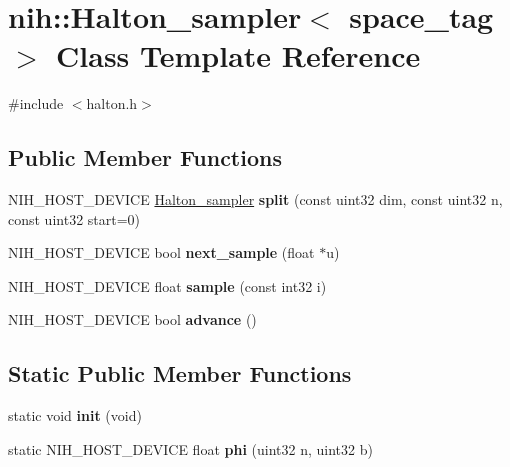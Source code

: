\hypertarget{classnih_1_1_halton__sampler}{
\section{nih\-:\-:\-Halton\-\_\-sampler$<$ space\-\_\-tag $>$ \-Class \-Template \-Reference}
\label{classnih_1_1_halton__sampler}
}


{\ttfamily \#include $<$halton.\-h$>$}

\subsection*{\-Public \-Member \-Functions}
\begin{DoxyCompactItemize}
\item 
\hypertarget{classnih_1_1_halton__sampler_a2629bef5c65d2abc451b8ce81606e102}{
\-N\-I\-H\-\_\-\-H\-O\-S\-T\-\_\-\-D\-E\-V\-I\-C\-E \hyperlink{classnih_1_1_halton__sampler}{\-Halton\-\_\-sampler} {\bfseries split} (const uint32 dim, const uint32 n, const uint32 start=0)}
\label{classnih_1_1_halton__sampler_a2629bef5c65d2abc451b8ce81606e102}

\item 
\hypertarget{classnih_1_1_halton__sampler_afed0ccb3419bead45e6206efbcd518db}{
\-N\-I\-H\-\_\-\-H\-O\-S\-T\-\_\-\-D\-E\-V\-I\-C\-E bool {\bfseries next\-\_\-sample} (float $\ast$u)}
\label{classnih_1_1_halton__sampler_afed0ccb3419bead45e6206efbcd518db}

\item 
\hypertarget{classnih_1_1_halton__sampler_a1a7f961078a0eb9bdfbf5971725bbd47}{
\-N\-I\-H\-\_\-\-H\-O\-S\-T\-\_\-\-D\-E\-V\-I\-C\-E float {\bfseries sample} (const int32 i)}
\label{classnih_1_1_halton__sampler_a1a7f961078a0eb9bdfbf5971725bbd47}

\item 
\hypertarget{classnih_1_1_halton__sampler_acb76fe00266c791b961d86cd60066c5a}{
\-N\-I\-H\-\_\-\-H\-O\-S\-T\-\_\-\-D\-E\-V\-I\-C\-E bool {\bfseries advance} ()}
\label{classnih_1_1_halton__sampler_acb76fe00266c791b961d86cd60066c5a}

\end{DoxyCompactItemize}
\subsection*{\-Static \-Public \-Member \-Functions}
\begin{DoxyCompactItemize}
\item 
\hypertarget{classnih_1_1_halton__sampler_acb1b04bfee449cf1f542739c05716f1c}{
static void {\bfseries init} (void)}
\label{classnih_1_1_halton__sampler_acb1b04bfee449cf1f542739c05716f1c}

\item 
\hypertarget{classnih_1_1_halton__sampler_a7944a650deca3478b7bb214986de330e}{
static \-N\-I\-H\-\_\-\-H\-O\-S\-T\-\_\-\-D\-E\-V\-I\-C\-E float {\bfseries phi} (uint32 n, uint32 b)}
\label{classnih_1_1_halton__sampler_a7944a650deca3478b7bb214986de330e}

\end{DoxyCompactItemize}
